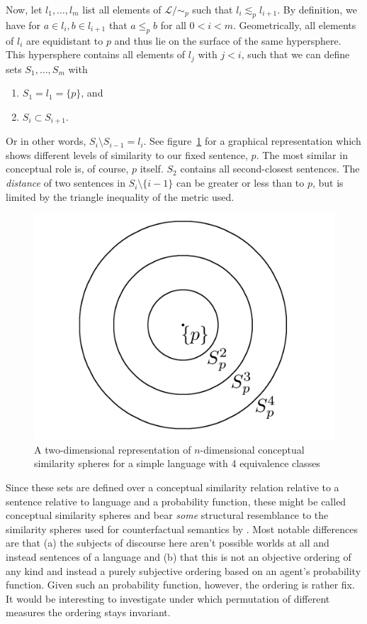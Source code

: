 \documentclass[11pt, a4paper]{article}
\renewcommand{\i}[1]{\emph{#1}}
\begin{document}
Now, let $l_1, \ldots, l_m$ list all elements of $\mathcal{L}/\!\sim_p$ such that $l_i \lesssim_p l_{i+1}$. By definition, we have for $a \in l_i, b \in l_{i+1}$ that $a \leqslant_p b$ for all $0 < i < m$. Geometrically, all elements of $l_i$ are equidistant to $p$ and thus lie on the surface of the same hypersphere. This hypersphere contains all elements of $l_j$ with $j < i$, such that we can define sets $S_1, \ldots, S_m$ with 
\begin{enumerate}[label = (\roman*)]
    \item $S_1 = l_1 = \{p\}$, and 
    \item $S_i \subset S_{i+1}$. 
\end{enumerate}
Or in other words, $S_i \setminus S_{i-1} = l_i$. See figure~\ref{fig:spheres} for a graphical representation which shows different levels of similarity to our fixed sentence, $p$. The most similar in conceptual role is, of course, $p$ itself. $S_2$ contains all second-closest sentences. The \i{distance} of two sentences in $S_i\setminus\{i-1\}$ can be greater or less than to $p$, but is limited by the triangle inequality of the metric used.  

\begin{figure}
	\centering
    \includegraphics[width=\textwidth]{Similarityspheres.png}
	\caption{A two-dimensional representation of $n$-dimensional conceptual similarity spheres for a simple language with 4 equivalence classes\label{fig:spheres}}
\end{figure}

Since these sets are defined over a conceptual similarity relation relative to a sentence relative to language and a probability function, these might be called conceptual similarity spheres and bear \i{some} structural resemblance to the similarity spheres used for counterfactual semantics by \textcite{Lewis1973-LEWC-2}. Most notable differences are that (a) the subjects of discourse here aren't possible worlds at all and instead sentences of a language and (b) that this is not an objective ordering of any kind and instead a purely subjective ordering based on an agent's probability function. Given such an probability function, however, the ordering is rather fix. It would be interesting to investigate under which permutation of different measures the ordering stays invariant.
\end{document}

